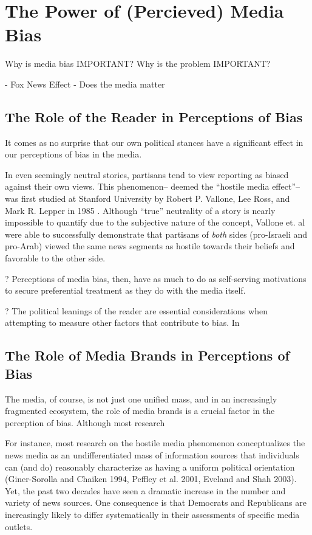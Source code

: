 \chapter{The Power of (Percieved) Media Bias}





Why is media bias IMPORTANT? Why is the problem IMPORTANT?

 
- Fox News Effect
- Does the media matter


\section{The Role of the Reader in Perceptions of Bias}

It comes as no surprise that our own political stances have a significant effect in our perceptions of bias in the media. 

In even seemingly neutral stories, partisans tend to view reporting as biased against their own views. This phenomenon-- deemed the ``hostile media effect''-- was first studied at Stanford University by Robert P. Vallone, Lee Ross, and Mark R. Lepper in 1985 \cite{vallone1985hostile}. Although ``true'' neutrality of a story is nearly impossible to quantify due to the subjective nature of the concept, Vallone et. al were able to successfully demonstrate that partisans of \emph{both} sides (pro-Israeli and pro-Arab) viewed the same news segments as hostile towards their beliefs and favorable to the other side.

? Perceptions of media bias, then, have as much to do as self-serving motivations to secure preferential treatment as they do with the media itself.
  
? The political leanings of the reader are essential considerations when attempting to measure other factors that contribute to bias. In 

\section{The Role of Media Brands in Perceptions of Bias}
The media, of course, is not just one unified mass, and in an increasingly fragmented ecosystem, the role of media brands is a crucial factor in the perception of bias. Although most research
\cite{baum2008eye}








For instance, most research on the hostile media phenomenon conceptualizes the news media as an undifferentiated mass of information sources that individuals can (and do) reasonably characterize as having a uniform political orientation (Giner-Sorolla and Chaiken 1994, Peffley et al. 2001, Eveland and Shah 2003). Yet, the past two decades have seen a dramatic increase in the number and variety of news sources. One consequence is that Democrats and Republicans are increasingly likely to differ systematically in their assessments of specific media outlets.







